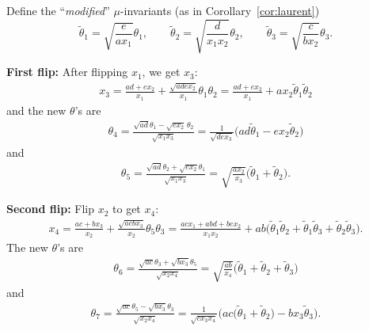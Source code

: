 \documentclass[pdftex]{sigma}
\newcommand{\til}[0]{\widetilde{\theta}}
\numberwithin{equation}{section}
\begin{document}
Define the ``\emph{modified}'' $\mu$-invariants (as in Corollary~\ref{cor:laurent})
\[ \til_1 = \sqrt{\frac{e}{ax_1}} \theta_1, \qquad \til_2 = \sqrt{\frac{d}{x_1x_2}} \theta_2, \qquad \til_3 =\sqrt{\frac{c}{bx_2}} \theta_3. \]

\textbf{First flip:} After flipping $x_1$, we get $x_3$:
\begin{align*}
 x_3 = \frac{ad + ex_2}{x_1} + \frac{\sqrt{adex_2}}{x_1} \theta_1 \theta_2
 = \frac{ad+ex_2}{x_1} + ax_2 \widetilde{\theta}_1 \widetilde{\theta}_2
\end{align*}
and the new $\theta$'s are
\begin{align*}
 \theta_4 = \frac{\sqrt{ad} \theta_1 - \sqrt{ex_2} \, \theta_2}{\sqrt{x_1x_3}}
 = \frac{1}{\sqrt{dex_3}} \big( ad \widetilde{\theta}_1 - ex_2 \widetilde{\theta}_2 \big)
\end{align*}
and
\begin{align*}
 \theta_5 = \frac{\sqrt{ad} \theta_2 + \sqrt{ex_2} \theta_1}{\sqrt{x_1x_3}}
 = \sqrt{\frac{ax_2}{x_3}} \big( \widetilde{\theta}_1 + \widetilde{\theta}_2 \big).
\end{align*}

\textbf{Second flip:} Flip $x_2$ to get $x_4$:
\begin{align*}
 x_4 = \frac{ac + bx_3}{x_2} + \frac{\sqrt{acbx_3}}{x_2} \theta_5 \theta_3
 = \frac{acx_1+abd+bex_2}{x_1x_2} + ab \big( \widetilde{\theta}_1 \widetilde{\theta}_2 + \widetilde{\theta}_1 \widetilde{\theta}_3 + \widetilde{\theta}_2 \widetilde{\theta}_3 \big).
\end{align*}
The new $\theta$'s are
\begin{align*}
 \theta_6 = \frac{\sqrt{ac} \theta_3 + \sqrt{bx_3} \theta_5}{\sqrt{x_2x_4}}
 = \sqrt{\frac{ab}{x_4}} \big( \widetilde{\theta}_1 + \widetilde{\theta}_2 + \widetilde{\theta}_3 \big)
\end{align*}
and
\begin{align*}
 \theta_7 = \frac{\sqrt{ac} \theta_5 - \sqrt{bx_3} \theta_3}{\sqrt{x_2x_4}}
 = \frac{1}{\sqrt{cx_3x_4}} \big( ac\big(\widetilde{\theta}_1 + \widetilde{\theta}_2\big) - bx_3 \widetilde{\theta}_3 \big).
\end{align*}
\end{document}
